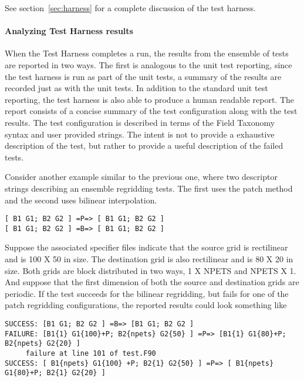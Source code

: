 See section~\ref{sec:harness} for a complete discussion of the test harness.


\paragraph{Analyzing Test Harness results }
When the Test Harness completes a run, the results from the ensemble of tests are
reported in two ways. The first is analogous to the unit test reporting, since the
test harness is run as part of the unit tests, a summary of the results are recorded 
just as with the unit tests. In addition to the standard unit test reporting, the
test harness is also able to produce a human readable report. The report consists 
of a concise summary of the test configuration along with the test results. The test 
configuration is described in terms of the Field Taxonomy syntax and user provided 
strings. The intent is not to provide a exhaustive description of the test, but 
rather to provide a useful description of the failed tests.

Consider another example similar to the previous one, where two descriptor strings 
describing an ensemble regridding tests. The first uses the patch method and the 
second uses bilinear interpolation.

\begin{center}
\begin{verbatim}
[ B1 G1; B2 G2 ] =P=> [ B1 G1; B2 G2 ] 
[ B1 G1; B2 G2 ] =B=> [ B1 G1; B2 G2 ] 
\end{verbatim}
\end{center}

Suppose the associated specifier files indicate that the source  grid is rectilinear
and is 100 X 50 in size. The destination grid is also rectilinear and is 80 X 20 
in size. 
Both grids are block distributed in two 
ways, 1 X NPETS and NPETS X 1. And suppose that the first dimension of both the
source and destination grids are periodic. If the test succeeds for the bilinear
regridding, but fails for one of the patch regridding configurations, the reported results
could look something like

\begin{verbatim}
SUCCESS: [B1 G1; B2 G2 ] =B=> [B1 G1; B2 G2 ] 
FAILURE: [B1{1} G1{100}+P; B2{npets} G2{50} ] =P=> [B1{1} G1{80}+P; B2{npets} G2{20} ] 
     failure at line 101 of test.F90
SUCCESS: [ B1{npets} G1{100} +P; B2{1} G2{50} ] =P=> [ B1{npets} G1{80}+P; B2{1} G2{20} ] 
\end{verbatim}

